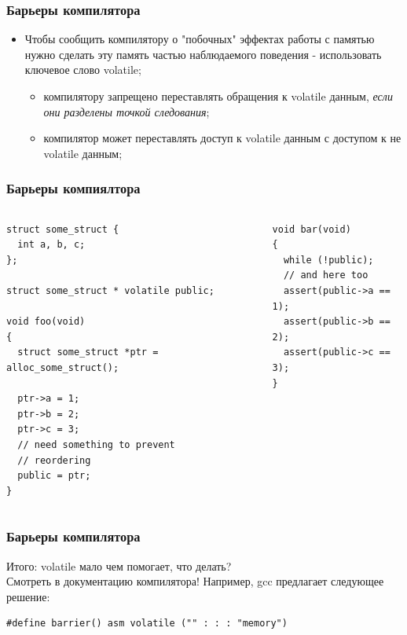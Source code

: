 \begin{frame}
\frametitle{Барьеры компилятора}

\begin{itemize}
  \item Чтобы сообщить компилятору о "побочных" эффектах работы с памятью
        нужно сделать эту память частью наблюдаемого поведения - использовать
        ключевое слово volatile;
        \begin{itemize}
          \item компилятору запрещено переставлять обращения к volatile
                данным, \emph{если они разделены точкой следования};
          \item компилятор может переставлять доступ к volatile данным с
                доступом к не volatile данным;
        \end{itemize}
\end{itemize}
\end{frame}

\begin{frame}[fragile]
\frametitle{Барьеры компиялтора}

\begin{columns}[T]
  \begin{column}{.45\linewidth}
    \begin{lstlisting}
struct some_struct {
  int a, b, c;
};

struct some_struct * volatile public;

void foo(void)
{
  struct some_struct *ptr = alloc_some_struct();

  ptr->a = 1;
  ptr->b = 2;
  ptr->c = 3;
  // need something to prevent
  // reordering
  public = ptr;
}
    \end{lstlisting}
  \end{column}
  \begin{column}{.45\linewidth}
    \begin{lstlisting}
void bar(void)
{
  while (!public);
  // and here too
  assert(public->a == 1);
  assert(public->b == 2);
  assert(public->c == 3);
}
    \end{lstlisting}
  \end{column}
\end{columns}
\end{frame}

\begin{frame}[fragile]
\frametitle{Барьеры компилятора}

Итого: volatile мало чем помогает, что делать? \\
Смотреть в документацию компилятора! Например, gcc предлагает
следующее решение:

\begin{lstlisting}
#define barrier() asm volatile ("" : : : "memory")
\end{lstlisting}
\end{frame}

